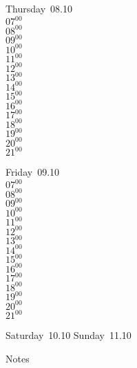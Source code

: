 \documentclass[11pt,a4paper]{book}\usepackage[]{graphicx}\usepackage[]{color}
\begin{document}
\clearpage
\begin{headerbox}
\end{headerbox}
\begin{weekdaybox}
  Thursday~08.10\\
  { 
  \vfill
  $07^{00}$\\
$08^{00}$\\
$09^{00}$\\
$10^{00}$\\
$11^{00}$\\
$12^{00}$\\
$13^{00}$\\
$14^{00}$\\
$15^{00}$\\
$16^{00}$\\
$17^{00}$\\
$18^{00}$\\
$19^{00}$\\
$20^{00}$\\
$21^{00}$\\
  }
\end{weekdaybox} 
\begin{weekdaybox}
  Friday~09.10\\
  { 
  \vfill
  $07^{00}$\\
$08^{00}$\\
$09^{00}$\\
$10^{00}$\\
$11^{00}$\\
$12^{00}$\\
$13^{00}$\\
$14^{00}$\\
$15^{00}$\\
$16^{00}$\\
$17^{00}$\\
$18^{00}$\\
$19^{00}$\\
$20^{00}$\\
$21^{00}$\\
  }
\end{weekdaybox}
\begin{weekendbox}
  Saturday~10.10
  \tcblower
  Sunday~11.10
\end{weekendbox} %
\begin{notebox}
  Notes
\end{notebox}
\clearpage
\end{document}
